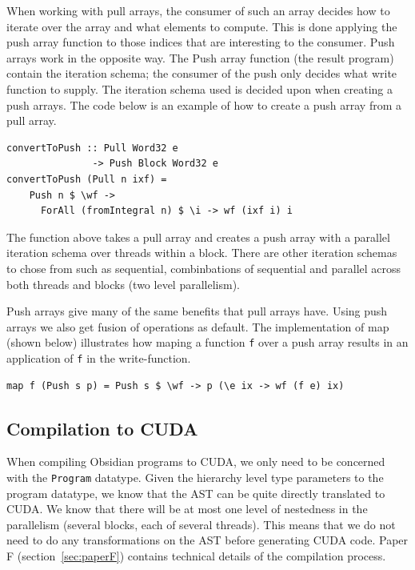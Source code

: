 \documentclass[a4paper]{book}
\begin{document}
When working with pull arrays, the consumer of such an array decides how to 
iterate over the array and what elements to compute. This is done applying the 
push array function to those indices that are interesting to the consumer. Push 
arrays work in the opposite way. The Push array function (the result program) contain 
the iteration schema; the consumer of the push only decides what write function 
to supply. The iteration schema used is decided upon when creating a push arrays. 
The code below is an example of how to create a push array from a pull array.

\begin{verbatim} 
convertToPush :: Pull Word32 e 
               -> Push Block Word32 e 
convertToPush (Pull n ixf) =
    Push n $ \wf -> 
      ForAll (fromIntegral n) $ \i -> wf (ixf i) i
\end{verbatim} 

The function above takes a pull array and creates a push array with a parallel 
iteration schema over threads within a block. There are other iteration schemas to 
chose from such as sequential, combinbations of sequential and parallel
across both threads and blocks (two level parallelism). 

Push arrays give many of the same benefits that pull arrays have. Using push 
arrays we also get fusion of operations as default. The implementation of map 
(shown below) illustrates how maping a function {\tt f} over a push array results 
in an application of {\tt f} in the write-function. 

\begin{verbatim} 
map f (Push s p) = Push s $ \wf -> p (\e ix -> wf (f e) ix)
\end{verbatim}

\subsection{Compilation to CUDA}

When compiling Obsidian programs to CUDA, we only need to be concerned with the 
{\tt Program} datatype. Given the hierarchy level type parameters to the program datatype, 
we know that the AST can be quite directly translated to CUDA. We know that there will 
be at most one level of nestedness in the parallelism (several blocks, each of several threads). 
This means that we do not need to do any transformations on the AST before generating CUDA code. 
Paper F (section~\ref{sec:paperF}) contains technical details of the compilation process. 
\end{document}
